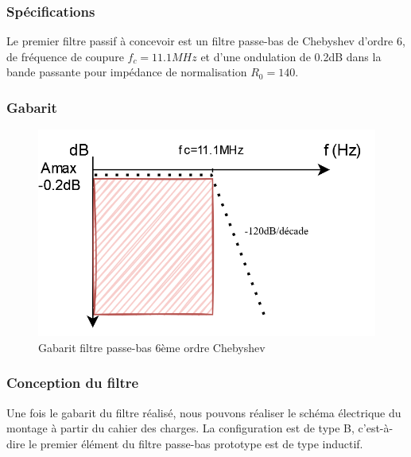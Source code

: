\begin{itemize}
    \subsubsection{Spécifications}

    \begin{flushleft}
        Le premier filtre passif à concevoir est un filtre passe-bas de Chebyshev d'ordre 6, de fréquence de coupure $f_c=11.1MHz$ et d'une ondulation de 0.2dB dans la bande passante pour impédance de normalisation $R_0=140${\Omega}.
    \end{flushleft}
    
    \subsubsection{Gabarit}
    \begin{figure}[!htbp]
      \centering
      \includegraphics[scale=0.40]{img/passe_bas.png}
      \caption{Gabarit filtre passe-bas 6ème ordre Chebyshev}
      \label{fig:boat1}
    \end{figure}
    \FloatBarrier

    \subsubsection{Conception du filtre}
        \begin{flushleft}
            Une fois le gabarit du filtre réalisé, nous pouvons réaliser le schéma électrique du montage à partir du cahier des charges.
            La configuration est de type B, c'est-à-dire le premier élément du filtre passe-bas prototype est de type inductif.
        \end{flushleft}
        

\end{itemize}
